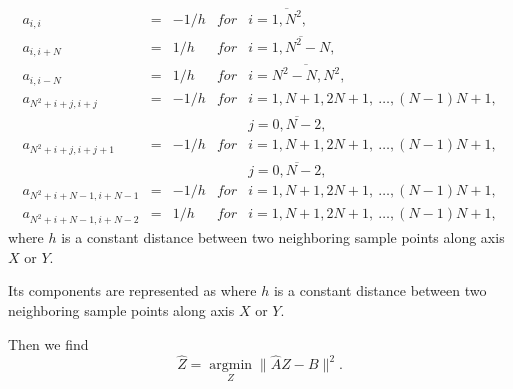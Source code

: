 \documentclass{beamer}
\begin{document}
\begin{frame}[c,allowframebreaks]
    \framebreak

    \small
    \begin{equation*}
        \begin{array}{lllll}
            a_{i,i}             & = &-1/h & for & i = \overline{1,N^2},                         \\
            a_{i,i+N}           & = &1/h  & for & i = \overline{1,N^2 - N},                     \\
            a_{i,i-N}           & = &1/h  & for & i = \overline{N^2 - N,N^2 },                  \\
            a_{N^2+i+j, i+j}    & = &-1/h & for & i = 1, N+1, 2N+1,~\dots, (N-1)N + 1,          \\
                                &   &       &   & j = \overline{0,N-2},                         \\
            a_{N^2+i+j, i+j+1}  & = &-1/h & for & i = 1, N+1, 2N+1,~\dots, (N-1)N + 1,          \\
                                &   &       &   & j = \overline{0,N-2},                         \\
            a_{N^2+i+N-1, i+N-1} &= &-1/h & for & i = 1, N+1, 2N+1,~\dots, (N-1)N + 1,          \\
            a_{N^2+i+N-1, i+N-2} &= &1/h  & for & i = 1, N+1, 2N+1,~\dots, (N-1)N + 1,
        \end{array}
    \end{equation*}
    where $h$ is a constant distance between two neighboring sample points along axis $X$ or $Y$.
    \normalsize

    \framebreak

    Its components are represented as
    where $h$ is a constant distance between two neighboring sample points along axis $X$ or $Y$.

    Then we find
    \begin{equation*}
        \hat{Z} = \operatorname{argmin}\limits_Z \|\hat{A} Z - B\|^2.
    \end{equation*}

\end{frame}
\end{document}
